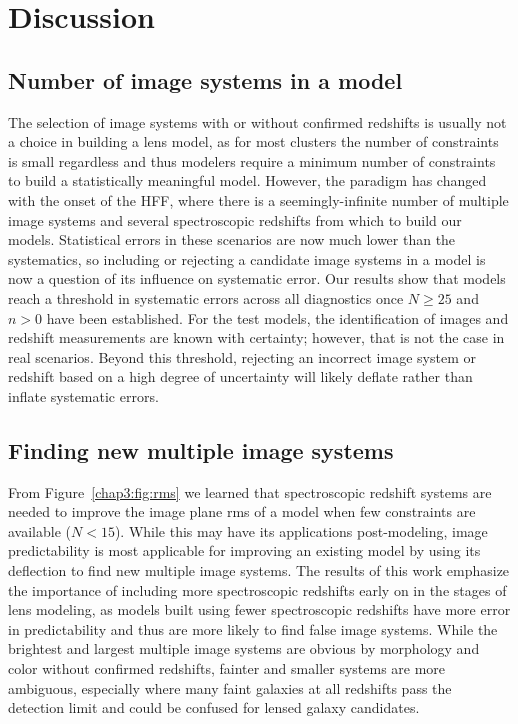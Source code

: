 \section{Discussion}
\label{chap3:sec:discussion}

\subsection{Number of image systems in a model}
The selection of image systems with or without confirmed redshifts is usually not a choice in building a lens model, as for most clusters the number of constraints is small regardless and thus modelers require a minimum number of constraints to build a statistically meaningful model. However, the paradigm has changed with the onset of the HFF, where there is a seemingly-infinite number of multiple image systems and several spectroscopic redshifts from which to build our models. Statistical errors in these scenarios are now much lower than the systematics, so including or rejecting a candidate image systems in a model is now a question of its influence on systematic error.  Our results show that models reach a threshold in systematic errors across all diagnostics once $N\geq25$ and $n>0$ have been established. For the test models, the identification of images and redshift measurements are known with certainty; however, that is not the case in real scenarios. Beyond this threshold, rejecting an incorrect image system or redshift based on a high degree of uncertainty will likely deflate rather than inflate systematic errors.

\subsection{Finding new multiple image systems}
From Figure~\ref{chap3:fig:rms} we learned that spectroscopic redshift systems are needed to improve the image plane rms of a model when few constraints are available ($N<15$). While this may have its applications post-modeling, image predictability is most applicable for improving an existing model by using its deflection to find new multiple image systems. The results of this work emphasize the importance of including more spectroscopic redshifts early on in the stages of lens modeling, as models built using fewer spectroscopic redshifts have more error in predictability and thus are more likely to find false image systems. While the brightest and largest multiple image systems are obvious by morphology and color without confirmed redshifts, fainter and smaller systems are more ambiguous, especially where many faint galaxies at all redshifts pass the detection limit and could be confused for lensed galaxy candidates.

